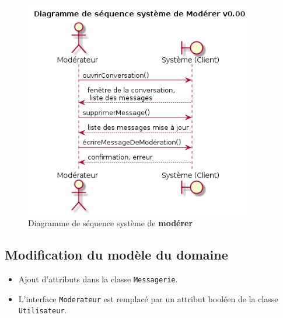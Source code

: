 \documentclass[11pt,dvipsnames,svgnames]{report}
\begin{document}
\begin{figure}[H]
\caption{Diagramme de séquence système de \textbf{modérer}}
\centerline{\includegraphics[width=0.9\textwidth]{diagrammes/dss-moderer.png}}
\end{figure}

\subsection{Modification du modèle du domaine}
\begin{itemize}
\item Ajout d'attributs dans la classe \texttt{Messagerie}.
\item L'interface \texttt{Moderateur} est remplacé par un attribut booléen de la classe \texttt{Utilisateur}.
\end{itemize}
\end{document}
